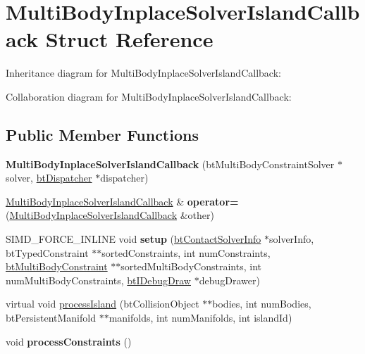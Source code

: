 \hypertarget{struct_multi_body_inplace_solver_island_callback}{\section{Multi\+Body\+Inplace\+Solver\+Island\+Callback Struct Reference}
\label{struct_multi_body_inplace_solver_island_callback}
}


Inheritance diagram for Multi\+Body\+Inplace\+Solver\+Island\+Callback\+:


Collaboration diagram for Multi\+Body\+Inplace\+Solver\+Island\+Callback\+:
\subsection*{Public Member Functions}
\begin{DoxyCompactItemize}
\item 
\hypertarget{struct_multi_body_inplace_solver_island_callback_afc065e540c1a1d196b4999f28b5f9b00}{{\bfseries Multi\+Body\+Inplace\+Solver\+Island\+Callback} (bt\+Multi\+Body\+Constraint\+Solver $\ast$solver, \hyperlink{classbt_dispatcher}{bt\+Dispatcher} $\ast$dispatcher)}\label{struct_multi_body_inplace_solver_island_callback_afc065e540c1a1d196b4999f28b5f9b00}

\item 
\hypertarget{struct_multi_body_inplace_solver_island_callback_a67fab240335e82b736d1439c808e0c2f}{\hyperlink{struct_multi_body_inplace_solver_island_callback}{Multi\+Body\+Inplace\+Solver\+Island\+Callback} \& {\bfseries operator=} (\hyperlink{struct_multi_body_inplace_solver_island_callback}{Multi\+Body\+Inplace\+Solver\+Island\+Callback} \&other)}\label{struct_multi_body_inplace_solver_island_callback_a67fab240335e82b736d1439c808e0c2f}

\item 
\hypertarget{struct_multi_body_inplace_solver_island_callback_aadb9f513e26d8b8b257bea2a65668725}{S\+I\+M\+D\+\_\+\+F\+O\+R\+C\+E\+\_\+\+I\+N\+L\+I\+N\+E void {\bfseries setup} (\hyperlink{structbt_contact_solver_info}{bt\+Contact\+Solver\+Info} $\ast$solver\+Info, bt\+Typed\+Constraint $\ast$$\ast$sorted\+Constraints, int num\+Constraints, \hyperlink{classbt_multi_body_constraint}{bt\+Multi\+Body\+Constraint} $\ast$$\ast$sorted\+Multi\+Body\+Constraints, int num\+Multi\+Body\+Constraints, \hyperlink{classbt_i_debug_draw}{bt\+I\+Debug\+Draw} $\ast$debug\+Drawer)}\label{struct_multi_body_inplace_solver_island_callback_aadb9f513e26d8b8b257bea2a65668725}

\item 
virtual void \hyperlink{struct_multi_body_inplace_solver_island_callback_a4de885af1dc5369ee882827e010afd4b}{process\+Island} (bt\+Collision\+Object $\ast$$\ast$bodies, int num\+Bodies, bt\+Persistent\+Manifold $\ast$$\ast$manifolds, int num\+Manifolds, int island\+Id)
\item 
\hypertarget{struct_multi_body_inplace_solver_island_callback_a4c687c04438636edf95ad84ac3774501}{void {\bfseries process\+Constraints} ()}\label{struct_multi_body_inplace_solver_island_callback_a4c687c04438636edf95ad84ac3774501}

\end{DoxyCompactItemize}
